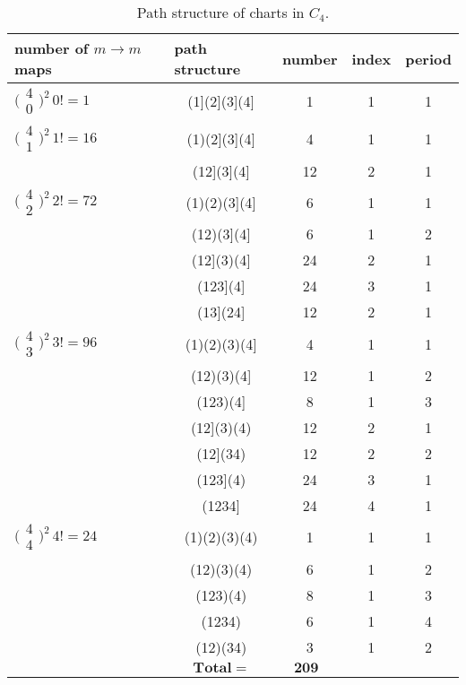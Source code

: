 \documentclass{surv-l}
\numberwithin{equation}{section}
\numberwithin{table}{section}
\numberwithin{figure}{section}
\theoremstyle{definition}
\begin{document}
\begin{table}[!h]
\caption{Path structure of charts in $C_{4}$.\label{tab2.7.1}}
{\begin{tabular}{@{}|l|c|c|c|c|@{}} \hline
\multicolumn{1}{|l|}{\textbf{number of} $m\rightarrow m$ \textbf{maps}}&  \multicolumn{1}{|l|}{\textbf{path structure}}&   \multicolumn{1}{|l|}{\textbf{number}}& \multicolumn{1}{|l|}{\textbf{index}}& \multicolumn{1}{|l|}{\textbf{period}} \\
\hline
\multicolumn{1}{|l|}{$\big(\!\begin{smallmatrix}4 \\ 0\end{smallmatrix}\!\big)^{2}\,0!=1$} &(1](2](3](4] &1 &1 &1 \\
\hline
\multicolumn{1}{|l|}{$\big(\!\begin{smallmatrix} 4\\ 1\end{smallmatrix}\!\big)^{2}\,1!=16$} &(1)(2](3](4] &4 &1 &1 \\
&(12](3](4] &12 &2 &1 \\
\hline
\multicolumn{1}{|l|}{$\big(\!\begin{smallmatrix}4\\ 2\end{smallmatrix}\!\big)^{2}\,2!=72$}&(1)(2)(3](4]& 6&1&1 \\
&(12)(3](4]&6&1&2 \\
&(12](3)(4]& 24&2&1 \\
& (123](4] &24&3&1 \\
& (13](24]&12&2&1 \\
\hline
\multicolumn{1}{|l|}{$\big(\!\begin{smallmatrix}4\\ 3\end{smallmatrix}\!\big)^{2}\,3!=96$}& (1)(2)(3)(4]&4&1&1 \\
&(12)(3)(4]&12&1&2 \\
& (123)(4] &8&1&3 \\
&(12](3)(4)&12 &2&1 \\
& (12](34)&12 &2&2 \\
& (123](4) &24 &3&1 \\
&(1234]&24&4&1  \\
\hline
\multicolumn{1}{|l|}{$\big(\!\begin{smallmatrix}4\\ 4\end{smallmatrix}\!\big)^{2}\,4!=24$}&(1)(2)(3)(4)&1&1&1 \\
&(12)(3)(4)&6&1&2 \\
&(123)(4)&8&1&3 \\
&(1234)&6&1&4 \\
& (12)(34)&3&1&2 \\
\hline
&\multicolumn{2}{|c|}{$\mathbf{Total} = \qquad\quad \mathbf{209}$} & & \\
 \hline
\end{tabular}}{}
\end{table}
\end{document}
